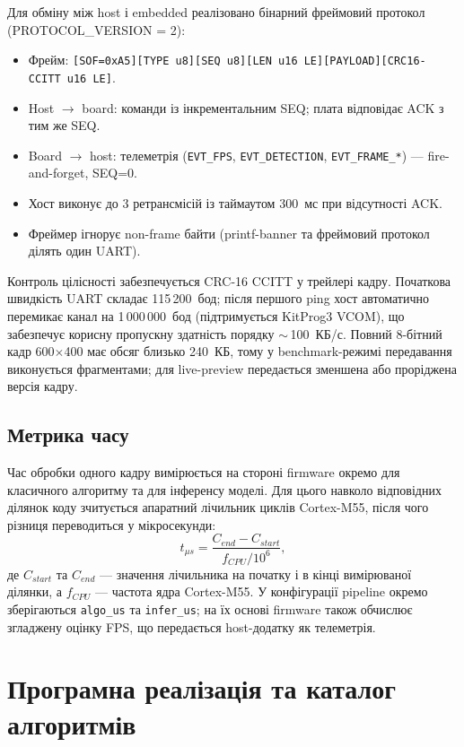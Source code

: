 \documentclass[a4paper,12pt]{article}
\let\oldsection\section
\renewcommand{\section}{\clearpage\oldsection}
\begin{document}
Для обміну між host і embedded реалізовано бінарний фреймовий протокол (PROTOCOL\_VERSION = 2):
\begin{itemize}
	\item Фрейм: \texttt{[SOF=0xA5][TYPE~u8][SEQ~u8][LEN~u16~LE][PAYLOAD][CRC16-CCITT~u16~LE]}.
	\item Host $\to$ board: команди із інкрементальним SEQ; плата відповідає ACK з тим же SEQ.
	\item Board $\to$ host: телеметрія (\texttt{EVT\_FPS}, \texttt{EVT\_DETECTION}, \texttt{EVT\_FRAME\_*}) --- fire-and-forget, SEQ=0.
	\item Хост виконує до 3 ретрансмісій із таймаутом 300~мс при відсутності ACK.
	\item Фреймер ігнорує non-frame байти (printf-banner та фреймовий протокол ділять один UART).
\end{itemize}

Контроль цілісності забезпечується CRC-16 CCITT у трейлері кадру. Початкова швидкість UART складає 115\,200~бод; після першого ping хост автоматично перемикає канал на 1\,000\,000~бод (підтримується KitProg3 VCOM), що забезпечує корисну пропускну здатність порядку $\sim$\,100~КБ/с. Повний 8-бітний кадр 600$\times$400 має обсяг близько 240~КБ, тому у benchmark-режимі передавання виконується фрагментами; для live-preview передається зменшена або проріджена версія кадру.

\subsection{Метрика часу}

Час обробки одного кадру вимірюється на стороні firmware окремо для класичного алгоритму та для інференсу моделі. Для цього навколо відповідних ділянок коду зчитується апаратний лічильник циклів Cortex-M55, після чого різниця переводиться у мікросекунди:
\[
t_{\mu s} = \frac{C_{end}-C_{start}}{f_{CPU}/10^6},
\]
де \(C_{start}\) та \(C_{end}\) --- значення лічильника на початку і в кінці вимірюваної ділянки, а \(f_{CPU}\) --- частота ядра Cortex-M55. У конфігурації pipeline окремо зберігаються \texttt{algo\_us} та \texttt{infer\_us}; на їх основі firmware також обчислює згладжену оцінку FPS, що передається host-додатку як телеметрія.

\section{Програмна реалізація та каталог алгоритмів}
\end{document}
